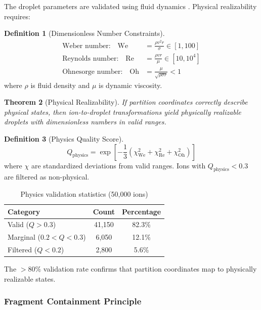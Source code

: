 \documentclass[twocolumn,10pt,a4paper]{article}
\newtheorem{theorem}{Theorem}[section]
\theoremstyle{definition}
\newtheorem{definition}[theorem]{Definition}
\theoremstyle{remark}
\begin{document}
The droplet parameters are validated using fluid dynamics \cite{lautrup2011}. Physical realizability requires:

\begin{definition}[Dimensionless Number Constraints]
\begin{align}
    \text{Weber number:} \quad \text{We} &= \frac{\rho v^2 r}{\sigma} \in [1, 100] \\
    \text{Reynolds number:} \quad \text{Re} &= \frac{\rho v r}{\mu} \in [10, 10^4] \\
    \text{Ohnesorge number:} \quad \text{Oh} &= \frac{\mu}{\sqrt{\rho \sigma r}} < 1
\end{align}
where $\rho$ is fluid density and $\mu$ is dynamic viscosity.
\end{definition}

\begin{theorem}[Physical Realizability]
\label{thm:realizability}
If partition coordinates correctly describe physical states, then ion-to-droplet transformations yield physically realizable droplets with dimensionless numbers in valid ranges.
\end{theorem}

\begin{definition}[Physics Quality Score]
\begin{equation}
    Q_{\text{physics}} = \exp\left[-\frac{1}{3}\left(\chi_{\text{We}}^2 + \chi_{\text{Re}}^2 + \chi_{\text{Oh}}^2\right)\right]
\end{equation}
where $\chi$ are standardized deviations from valid ranges. Ions with $Q_{\text{physics}} < 0.3$ are filtered as non-physical.
\end{definition}

\begin{table}[h]
\centering
\caption{Physics validation statistics (50,000 ions)}
\begin{tabular}{lcc}
\toprule
Category & Count & Percentage \\
\midrule
Valid ($Q > 0.3$) & 41,150 & 82.3\% \\
Marginal ($0.2 < Q < 0.3$) & 6,050 & 12.1\% \\
Filtered ($Q < 0.2$) & 2,800 & 5.6\% \\
\bottomrule
\end{tabular}
\end{table}

The $>80\%$ validation rate confirms that partition coordinates map to physically realizable states.

\subsubsection{Fragment Containment Principle}
\end{document}
